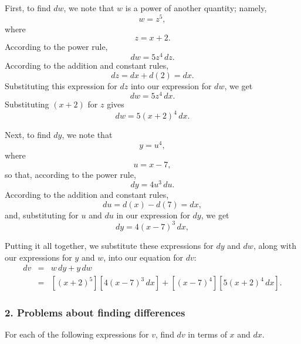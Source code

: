 \documentclass[polutonikogreek,english,twoside,openright]{article}
\begin{document}
\begin{enumerate}
First, to find $dw$, we note that $w$ is a power of another quantity; namely,
$$w = z^5,$$
where 
$$z = x+2.$$
According to the power rule,
$$dw = 5z^4\,dz.$$
According to the addition and constant rules,
$$dz = dx + d(2) = dx.$$
Substituting this expression for $dz$ into our expression for $dw$, we get
$$dw = 5z^4\,dx.$$
Substituting $(x+2)$ for $z$ gives
$$dw = 5(x+2)^4\,dx.$$

Next, to find $dy$, we note that 
$$y = u^4,$$
where 
$$u = x -7,$$
so that, according to the power rule,
$$dy = 4u^3\,du.$$
According to the addition and constant rules, 
$$du = d(x) - d(7) = dx,$$
and, substituting for $u$ and $du$ in our expression for $dy$, we get
$$dy = 4(x-7)^3\,dx,$$

Putting it all together, we substitute these expressions for $dy$ and
$dw$, along with our expressions for $y$ and $w$, into our equation
for $dv$:
\begin{eqnarray*}
dv & = & w\,dy + y\,dw \\
& = & \left[(x+2)^5\right]\left[4(x-7)^3\,dx\right] + \left[(x-7)^4\right]\left[5(x+2)^4\,dx\right] .
\end{eqnarray*}
 
 
\end{enumerate}


\subsubsection*{2. Problems about finding differences}
For each of the following expressions for $v$, find $dv$ in terms of $x$ and $dx$.\label{pset1}
\end{document}
